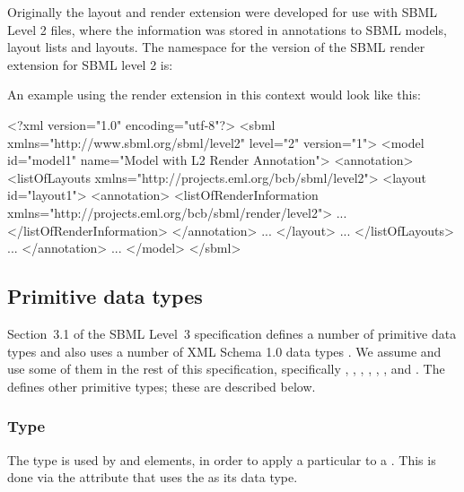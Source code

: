 Originally the layout and render extension were developed for use with SBML Level 2 files, where the information was stored in annotations to SBML models, layout lists and layouts.
The namespace for the version of the SBML render extension for SBML level 2 is: 

\begin{center}
\end{center}

An example using the render extension in this context would look like this: 

\begin{example}
<?xml version="1.0" encoding="utf-8"?>
<sbml xmlns="http://www.sbml.org/sbml/level2" level="2" version="1">
  <model id="model1" name="Model with L2 Render Annotation">
    <annotation>
      <listOfLayouts xmlns="http://projects.eml.org/bcb/sbml/level2">
        <layout id="layout1">
          <annotation>
            <listOfRenderInformation xmlns="http://projects.eml.org/bcb/sbml/render/level2">
							...
            </listOfRenderInformation>
          </annotation>
					...
        </layout>
				...
      </listOfLayouts>
			...
    </annotation>
		...
  </model>
</sbml>
\end{example}

\subsection{Primitive data types}
\label{primitive-types}

Section~3.1 of the SBML Level~3 specification defines a number of
primitive data types and also uses a number of XML Schema 1.0 data types
\citep{biron:2000}. We assume and use some of them in the rest of this
specification, specifically , , , ,
, , and . The
\RenderPackage defines other primitive types; these are described below.


\subsubsection{Type \fixttspace{}}

The type  is used by \LocalStyle and \GlobalStyle elements, in order
to apply a particular \Style to a \GraphicalObject. This is done via the  attribute
that uses the  as its data type. 

